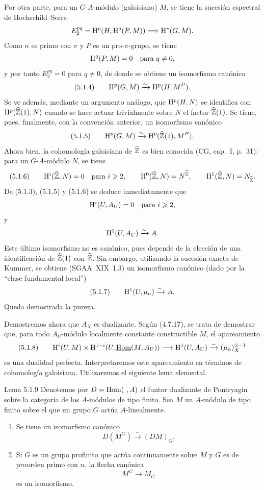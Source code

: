\begin{prooftext}[Demostración]
Por otra parte, para un $G$-$A$-módulo (galoisiano) $M$, se tiene la sucesión espectral de Hochschild--Serre
\[
E_2^{pq}=\mathrm{H}^p(H,\mathrm{H}^q(P,M))\Longrightarrow \mathrm{H}^{*}(G,M).
\]
Como $n$ es primo con $\pi$ y $P$ es un pro-$\pi$-grupo, se tiene
\[
\mathrm{H}^q(P,M)=0\quad\text{para }q\ne0,
\]
y por tanto $E_2^{pq}=0$ para $q\ne0$, de donde se obtiene un isomorfismo canónico
\[
(5.1.4)\qquad \mathrm{H}^p(G,M)\xrightarrow{\sim}\mathrm{H}^p(H,M^P).
\]
Se ve además, mediante un argumento análogo, que $\mathrm{H}^p(H,N)$ se identifica con $\mathrm{H}^p(\widehat{\mathbb{Z}}(1),N)$ cuando se hace actuar trivialmente sobre $N$ el factor $\widehat{\mathbb{Z}}(1)$. Se tiene, pues, finalmente, con la convención anterior, un isomorfismo canónico
\[
(5.1.5)\qquad \mathrm{H}^p(G,M)\xrightarrow{\sim}\mathrm{H}^p(\widehat{\mathbb{Z}}(1),M^P).
\]
Ahora bien, la cohomología galoisiana de $\widehat{\mathbb{Z}}$ es bien conocida (CG, cap.~I, p.~31): para un $G$-$A$-módulo $N$, se tiene
\[
(5.1.6)\qquad
\mathrm{H}^i(\widehat{\mathbb{Z}},N)=0\quad\text{para }i\geqslant2,
\qquad
\mathrm{H}^0(\widehat{\mathbb{Z}},N)=N^{\widehat{\mathbb{Z}}},
\qquad
\mathrm{H}^1(\widehat{\mathbb{Z}},N)=N_{\widehat{\mathbb{Z}}}.
\]
De (5.1.3), (5.1.5) y (5.1.6) se deduce inmediatamente que
\[
\mathrm{H}^i(U,A_U)=0\quad\text{para }i\geqslant2,
\]
y
\[
\mathrm{H}^1(U,A_U)\xrightarrow{\sim}A.
\]
Este último isomorfismo no es canónico, pues depende de la elección de una identificación de $\widehat{\mathbb{Z}}(1)$ con $\widehat{\mathbb{Z}}$. Sin embargo, utilizando la sucesión exacta de Kummer, se obtiene (SGAA~XIX~1.3) un isomorfismo canónico (dado por la \textquotedblleft clase fundamental local\textquotedblright{})
\[
(5.1.7)\qquad \mathrm{H}^1(U,\mu_n)\xrightarrow{\sim}A.
\]
Queda demostrada la pureza.

Demostremos ahora que $A_X$ es dualizante. Según (4.7.17), se trata de demostrar que, para todo $A_U$-módulo localmente constante constructible $M$, el apareamiento
\[
(5.1.8)\qquad \mathrm{H}^i(U,M)\times\mathrm{H}^{1-i}(U,\underline{\operatorname{Hom}}(M,A_U))\longrightarrow \mathrm{H}^1(U,A_U)\xrightarrow{\sim}(\mu_n)_X^{\otimes -1}
\]
es una dualidad perfecta. Interpretaremos este apareamiento en términos de cohomología galoisiana. Utilizaremos el siguiente lema elemental.
\end{prooftext}

\begin{statement}{Lema 5.1.9}
Denotemos por $D=\operatorname{Hom}(\ ,A)$ el funtor dualizante de Pontryagin sobre la categoría de los $A$-módulos de tipo finito. Sea $M$ un $A$-módulo de tipo finito sobre el que un grupo $G$ actúa $A$-linealmente.
\begin{enumerate}[label=(\roman*)]
\item Se tiene un isomorfismo canónico
\[
D(M^G)\xrightarrow{\sim}(DM)_G.
\]
\item Si $G$ es un grupo profinito que actúa continuamente sobre $M$ y $G$ es de proorden primo con $n$, la flecha canónica
\[
M^G\longrightarrow M_G
\]
es un isomorfismo.
\end{enumerate}
\end{statement}

